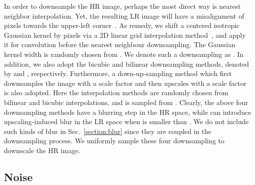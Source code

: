 \documentclass[10pt,twocolumn,letterpaper]{article}
\begin{document}
In order to downsample the HR image, perhaps the most direct way is nearest neighbor interpolation. Yet, the resulting LR image will have a misalignment of  pixels towards the upper-left corner~\cite{zhang2020deep}. As remedy, we shift a centered  isotropic Gaussian kernel by  pixels via a 2D linear grid interpolation method~\cite{liu2013bayesian}, and apply it for convolution before the nearest neighbour downsampling. The Gaussian kernel width is randomly chosen from .
We denote such a downsampling as .
In addition, we also adopt the bicubic and bilinear downsampling methods, denoted by  and , respectively.
Furthermore, a down-up-sampling method  which first downsamples the image with a scale factor  and then upscales with a scale factor  is also adopted. Here the interpolation methods are randomly chosen from bilinear and bicubic interpolations, and  is sampled from . Clearly, the above four downsampling methods have a blurring step in the HR space, while  can introduce upscaling-induced blur in the LR space when  is smaller than .
We do not include such kinds of blur in Sec.~\ref{section:blur} since they are coupled in the downsampling process. We uniformly sample these four downsampling to downscale the HR image.

\subsection{Noise}
\label{section:noise}
\end{document}
